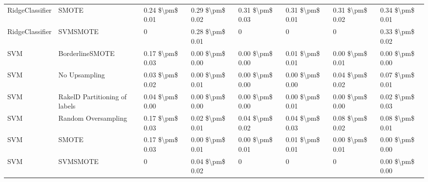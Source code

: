 \begin{tabular}{llllllll}
                RidgeClassifier &                         SMOTE & 0.24 \$\textbackslash pm\$ 0.01 &           0.29 \$\textbackslash pm\$ 0.02 &       0.31 \$\textbackslash pm\$ 0.03 &        0.31 \$\textbackslash pm\$ 0.01 &                         0.31 \$\textbackslash pm\$ 0.02 &     0.34 \$\textbackslash pm\$ 0.01 \\
                RidgeClassifier &                      SVMSMOTE &               0 &           0.28 \$\textbackslash pm\$ 0.01 &                     0 &                      0 &                                       0 &     0.33 \$\textbackslash pm\$ 0.02 \\
                            SVM &               BorderlineSMOTE & 0.17 \$\textbackslash pm\$ 0.03 &           0.00 \$\textbackslash pm\$ 0.00 &       0.00 \$\textbackslash pm\$ 0.00 &        0.01 \$\textbackslash pm\$ 0.01 &                         0.00 \$\textbackslash pm\$ 0.01 &     0.00 \$\textbackslash pm\$ 0.00 \\
                            SVM &                 No Upsampling & 0.03 \$\textbackslash pm\$ 0.02 &           0.00 \$\textbackslash pm\$ 0.01 &       0.00 \$\textbackslash pm\$ 0.00 &        0.00 \$\textbackslash pm\$ 0.00 &                         0.04 \$\textbackslash pm\$ 0.02 &     0.07 \$\textbackslash pm\$ 0.01 \\
                            SVM & RakelD Partitioning of labels & 0.04 \$\textbackslash pm\$ 0.00 &           0.00 \$\textbackslash pm\$ 0.00 &       0.00 \$\textbackslash pm\$ 0.00 &        0.00 \$\textbackslash pm\$ 0.01 &                         0.00 \$\textbackslash pm\$ 0.00 &     0.02 \$\textbackslash pm\$ 0.03 \\
                            SVM &           Random Oversampling & 0.17 \$\textbackslash pm\$ 0.03 &           0.02 \$\textbackslash pm\$ 0.01 &       0.04 \$\textbackslash pm\$ 0.02 &        0.04 \$\textbackslash pm\$ 0.03 &                         0.08 \$\textbackslash pm\$ 0.02 &     0.08 \$\textbackslash pm\$ 0.01 \\
                            SVM &                         SMOTE & 0.17 \$\textbackslash pm\$ 0.03 &           0.00 \$\textbackslash pm\$ 0.01 &       0.00 \$\textbackslash pm\$ 0.01 &        0.01 \$\textbackslash pm\$ 0.01 &                         0.00 \$\textbackslash pm\$ 0.01 &     0.00 \$\textbackslash pm\$ 0.00 \\
                            SVM &                      SVMSMOTE &               0 &           0.04 \$\textbackslash pm\$ 0.02 &                     0 &                      0 &                                       0 &     0.00 \$\textbackslash pm\$ 0.00 \\

\end{tabular}
